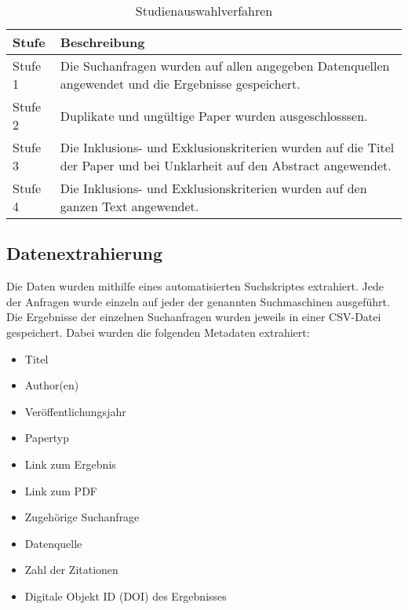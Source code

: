 \documentclass[conference,compsoc]{IEEEtran}
\begin{document}
\begin{table}[h]
	\caption{Studienauswahlverfahren}
	\label{tabelle:auswahlverfahren}
\begin{tabular}{p{1cm}|p{6.5cm}}

	Stufe & Beschreibung \\
	\hline	
	Stufe 1 & Die Suchanfragen wurden auf allen angegeben Datenquellen angewendet und die Ergebnisse gespeichert.\\
	
	Stufe 2 & Duplikate und ungültige Paper wurden ausgeschlosssen.\\
	
	Stufe 3 & Die Inklusions- und Exklusionskriterien wurden auf die Titel der Paper und bei Unklarheit auf den Abstract angewendet. \\
	
	
	Stufe 4 & Die Inklusions- und Exklusionskriterien wurden auf den ganzen Text angewendet.
	
\end{tabular}
\end{table}


\subsection{Datenextrahierung}
Die Daten wurden mithilfe eines automatisierten Suchskriptes extrahiert.
Jede der Anfragen wurde einzeln auf jeder der genannten Suchmaschinen ausgeführt. Die Ergebnisse der einzelnen Suchanfragen wurden jeweils in einer CSV-Datei gespeichert.
Dabei wurden die folgenden Metadaten extrahiert:

\begin{itemize}
	\item Titel
	\item Author(en)
	\item Veröffentlichungsjahr
	\item Papertyp
	\item Link zum Ergebnis
	\item Link zum PDF
	\item Zugehörige Suchanfrage
	\item Datenquelle
	\item Zahl der Zitationen
	\item Digitale Objekt ID (DOI) des Ergebnisses
\end{itemize}
\end{document}
